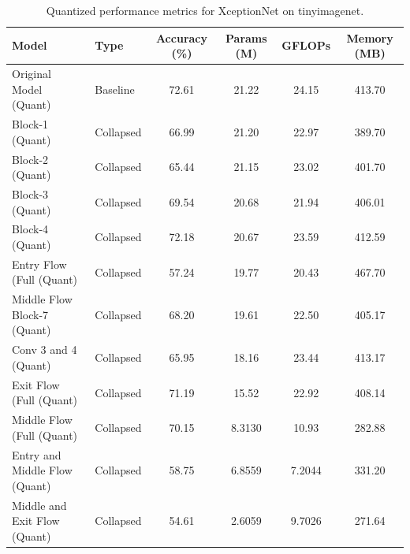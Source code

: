 \begin{table}
\caption{Quantized performance metrics for XceptionNet on tinyimagenet.}
\label{tab:XceptionNet_tinyimagenet_quant}
\begin{tabular}{llcccc}
\toprule
Model & Type & Accuracy (\%) & Params (M) & GFLOPs & Memory (MB) \\
\midrule
Original Model
(Quant) & Baseline & 72.61 & 21.22 & 24.15 & 413.70 \\
Block-1
(Quant) & Collapsed & 66.99 & 21.20 & 22.97 & 389.70 \\
Block-2
(Quant) & Collapsed & 65.44 & 21.15 & 23.02 & 401.70 \\
Block-3
(Quant) & Collapsed & 69.54 & 20.68 & 21.94 & 406.01 \\
Block-4
(Quant) & Collapsed & 72.18 & 20.67 & 23.59 & 412.59 \\
Entry Flow (Full
(Quant) & Collapsed & 57.24 & 19.77 & 20.43 & 467.70 \\
Middle Flow Block-7
(Quant) & Collapsed & 68.20 & 19.61 & 22.50 & 405.17 \\
Conv 3 and 4
(Quant) & Collapsed & 65.95 & 18.16 & 23.44 & 413.17 \\
Exit Flow (Full
(Quant) & Collapsed & 71.19 & 15.52 & 22.92 & 408.14 \\
Middle Flow (Full
(Quant) & Collapsed & 70.15 & 8.3130 & 10.93 & 282.88 \\
Entry and Middle Flow
(Quant) & Collapsed & 58.75 & 6.8559 & 7.2044 & 331.20 \\
Middle and Exit Flow
(Quant) & Collapsed & 54.61 & 2.6059 & 9.7026 & 271.64 \\
\bottomrule
\end{tabular}
\end{table}
